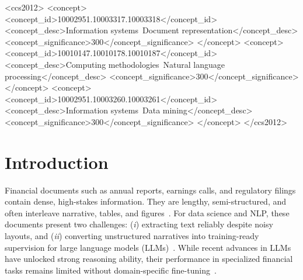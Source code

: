 \documentclass[sigconf,authordraft,anonymous]{acmart}
\begin{document}
\begin{CCSXML}
<ccs2012>
 <concept>
  <concept_id>10002951.10003317.10003318</concept_id>
  <concept_desc>Information systems~Document representation</concept_desc>
  <concept_significance>300</concept_significance>
 </concept>
 <concept>
  <concept_id>10010147.10010178.10010187</concept_id>
  <concept_desc>Computing methodologies~Natural language processing</concept_desc>
  <concept_significance>300</concept_significance>
 </concept>
 <concept>
  <concept_id>10002951.10003260.10003261</concept_id>
  <concept_desc>Information systems~Data mining</concept_desc>
  <concept_significance>300</concept_significance>
 </concept>
</ccs2012>
\end{CCSXML}



\maketitle

\section{Introduction}
Financial documents such as annual reports, earnings calls, and regulatory filings contain dense, high-stakes information. They are lengthy, semi-structured, and often interleave narrative, tables, and figures~\cite{Meirkulov2024,FINRA2023}. For data science and NLP, these documents present two challenges: (\emph{i}) extracting text reliably despite noisy layouts, and (\emph{ii}) converting unstructured narratives into training-ready supervision for large language models (LLMs)~\cite{Feng2021}. While recent advances in LLMs have unlocked strong reasoning ability, their performance in specialized financial tasks remains limited without domain-specific fine-tuning~\cite{Jeong2024}.
\end{document}
